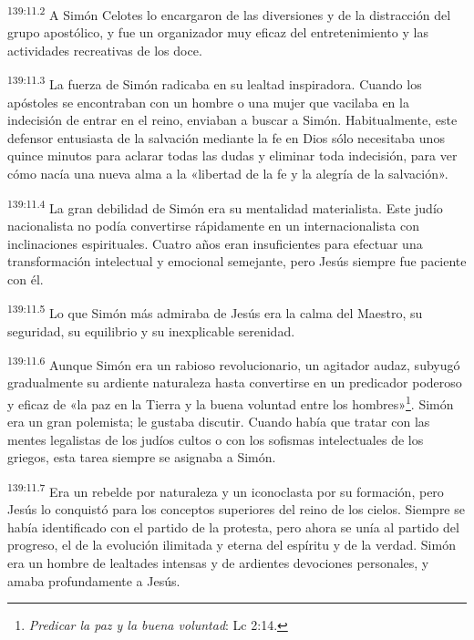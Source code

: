 \par
\textsuperscript{139:11.2} A Simón Celotes lo encargaron de las diversiones y de la distracción del grupo apostólico, y fue un organizador muy eficaz del entretenimiento y las actividades recreativas de los doce.

\par
\textsuperscript{139:11.3} La fuerza de Simón radicaba en su lealtad inspiradora. Cuando los apóstoles se encontraban con un hombre o una mujer que vacilaba en la indecisión de entrar en el reino, enviaban a buscar a Simón. Habitualmente, este defensor entusiasta de la salvación mediante la fe en Dios sólo necesitaba unos quince minutos para aclarar todas las dudas y eliminar toda indecisión, para ver cómo nacía una nueva alma a la «libertad de la fe y la alegría de la salvación».

\par
\textsuperscript{139:11.4} La gran debilidad de Simón era su mentalidad materialista. Este judío nacionalista no podía convertirse rápidamente en un internacionalista con inclinaciones espirituales. Cuatro años eran insuficientes para efectuar una transformación intelectual y emocional semejante, pero Jesús siempre fue paciente con él.

\par
\textsuperscript{139:11.5} Lo que Simón más admiraba de Jesús era la calma del Maestro, su seguridad, su equilibrio y su inexplicable serenidad.

\par
\textsuperscript{139:11.6} Aunque Simón era un rabioso revolucionario, un agitador audaz, subyugó gradualmente su ardiente naturaleza hasta convertirse en un predicador poderoso y eficaz de «la paz en la Tierra y la buena voluntad entre los hombres»\footnote{\textit{Predicar la paz y la buena voluntad}: Lc 2:14.}. Simón era un gran polemista; le gustaba discutir. Cuando había que tratar con las mentes legalistas de los judíos cultos o con los sofismas intelectuales de los griegos, esta tarea siempre se asignaba a Simón.

\par
\textsuperscript{139:11.7} Era un rebelde por naturaleza y un iconoclasta por su formación, pero Jesús lo conquistó para los conceptos superiores del reino de los cielos. Siempre se había identificado con el partido de la protesta, pero ahora se unía al partido del progreso, el de la evolución ilimitada y eterna del espíritu y de la verdad. Simón era un hombre de lealtades intensas y de ardientes devociones personales, y amaba profundamente a Jesús.

